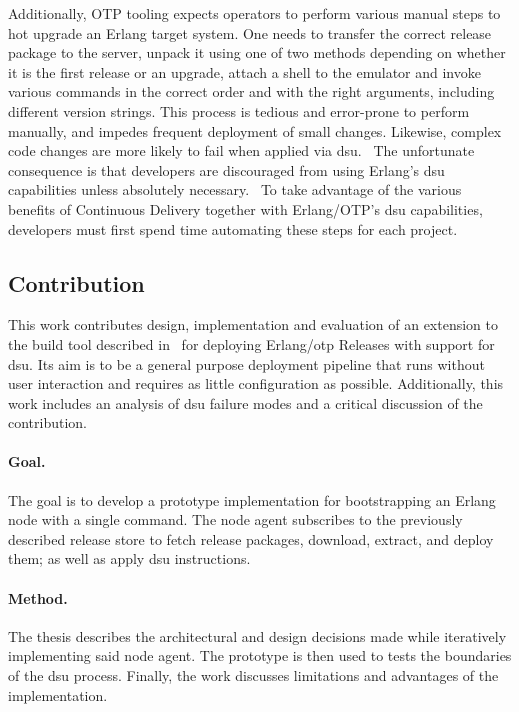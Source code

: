 Additionally, OTP tooling expects operators to perform various manual steps to hot upgrade an Erlang target system. One needs to transfer the correct release package to the server, unpack it using one of two methods depending on whether it is the first release or an upgrade, attach a shell to the emulator and invoke various commands in the correct order and with the right arguments, including different version strings.
This process is tedious and error-prone to perform manually, and impedes frequent deployment of small changes. Likewise, complex code changes are more likely to fail when applied via \acrshort{dsu}.~\cite{hicks} The unfortunate consequence is that developers are discouraged from using Erlang's \acrshort{dsu} capabilities unless absolutely necessary.~\cite{ferd} To take advantage of the various benefits of Continuous Delivery together with Erlang/OTP's \acrshort{dsu} capabilities, developers must first spend time automating these steps for each project.


\subsection{Contribution}

This work contributes design, implementation and evaluation of an extension to the build tool described in~\cite{zak18} for deploying Erlang/\acrshort{otp} Releases with support for \acrshort{dsu}. Its aim is to be a general purpose deployment pipeline that runs without user interaction and requires as little configuration as possible. Additionally, this work includes an analysis of \acrshort{dsu} failure modes and a critical discussion of the contribution.

\paragraph{Goal.} The goal is to develop a prototype implementation for bootstrapping an Erlang node with a single command. The node agent subscribes to the previously described release store to fetch release packages, download, extract, and deploy them; as well as apply \acrshort{dsu} instructions.

\paragraph{Method.} The thesis describes the architectural and design decisions made while iteratively implementing said node agent. The prototype is then used to tests the boundaries of the \acrshort{dsu} process. Finally, the work discusses limitations and advantages of the implementation.

